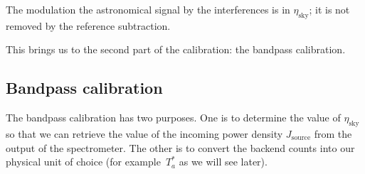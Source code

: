 The modulation the astronomical signal by the interferences is in $\eta_\text{sky}$; it is not removed by the reference subtraction.

This brings us to the second part of the calibration: the bandpass calibration.

\subsection{Bandpass calibration}

The bandpass calibration has two purposes.
One is to determine the value of $\eta_\text{sky}$ so that we can retrieve the value of the incoming power density $J_\text{source}$ from the output of the spectrometer.
The other is to convert the backend counts into our physical unit of choice (for example~$T_a^*$ as we will see later).

